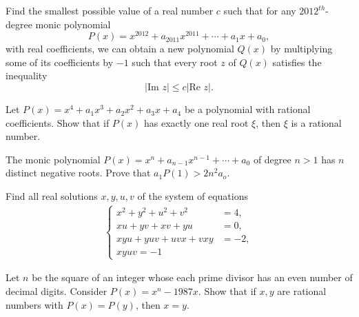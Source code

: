 \begin{question}[name={2012 China TST}]
    Find the smallest possible value of a real number $c$ such that for any $2012^{th}$-degree monic polynomial
    \[P(x)=x^{2012}+a_{2011}x^{2011}+\cdots+a_1x+a_0,\] with real coefficients, we can obtain a new polynomial $Q(x)$ by multiplying some of its coefficients by $-1$ such that every root $z$ of $Q(x)$ satisfies the inequality
    \[ \left\lvert \text{Im } z \right\rvert \le c \left\lvert \text{Re } z \right\rvert. \]
\end{question}



\begin{question}[name={1981 Austrian--Polish}]
    Let $P(x) = x^4 + a_1x^3 + a_2x^2 + a_3x + a_4$ be a polynomial with rational coefficients. Show that if $P(x)$ has exactly one real root $\xi$, then $\xi$ is a rational number.
\end{question}


\begin{question}[name={1986 Austrian--Polish}]
    The monic polynomial $P(x) = x^n + a_{n-1}x^{n-1} +\cdots+ a_0$ of degree $n > 1$ has $n$ distinct negative roots. Prove that $a_1P(1) > 2n^2a_o$.
\end{question}




\begin{question}[name={1986 Austrian--Polish}]
    Find all real solutions $x,y,u,v$ of the system of equations
    \begin{align*}
        \begin{cases}
            x^2 + y^2 + u^2 + v^2 &= 4,\\
            xu + yv + xv + yu &= 0,\\
            xyu + yuv + uvx + vxy &= - 2,\\
            xyuv = -1
        \end{cases}
    \end{align*}
\end{question}




\begin{question}[name={1987 Austrian--Polish}]
    Let $n$ be the square of an integer whose each prime divisor has an even number of decimal digits. Consider $P(x) = x^n - 1987x$. Show that if $x,y$ are rational numbers with $P(x) = P(y)$, then $x = y$.
\end{question}




